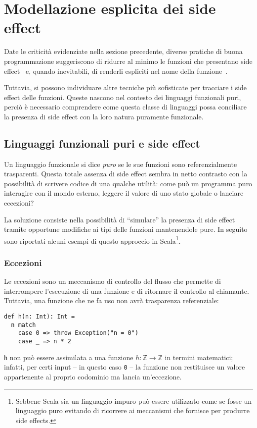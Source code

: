 \section{Modellazione esplicita dei side effect}
\label{modellazione-esplicita-dei-side-effect}

Date le criticità evidenziate nella sezione precedente, diverse pratiche di buona programmazione suggeriscono di ridurre al minimo le funzioni che presentano side effect~\cite[p.~44]{cit:clean-code-a-handbook-of-agile-software-craftsmanship} e, quando inevitabili, di renderli espliciti nel nome della funzione~\cite[p.~313]{cit:clean-code-a-handbook-of-agile-software-craftsmanship}.

Tuttavia, si possono individuare altre tecniche più sofisticate per tracciare i side effect delle funzioni.
Queste nascono nel contesto dei linguaggi funzionali puri, perciò è necessario comprendere come questa classe di linguaggi possa conciliare la presenza di side effect con la loro natura puramente funzionale.

\subsection{Linguaggi funzionali puri e side effect}
\label{linguaggi-funzionali-puri-e-side-effect}
Un linguaggio funzionale si dice \emph{puro} se le sue funzioni sono referenzialmente trasparenti.
Questa totale assenza di side effect sembra in netto contrasto con la possibilità di scrivere codice di una qualche utilità: come può un programma puro interagire con il mondo esterno, leggere il valore di uno stato globale o lanciare eccezioni?

La soluzione consiste nella possibilità di ``simulare'' la presenza di side effect tramite opportune modifiche ai tipi delle funzioni mantenendole pure.
In seguito sono riportati alcuni esempi di questo approccio in Scala\footnote{Sebbene Scala sia un linguaggio impuro può essere utilizzato come se fosse un linguaggio puro evitando di ricorrere ai meccanismi che fornisce per produrre side effects.}.

\subsubsection{Eccezioni}
\label{eccezioni}
Le eccezioni sono un meccanismo di controllo del flusso che permette di interrompere l'esecuzione di una funzione e di ritornare il controllo al chiamante.
Tuttavia, una funzione che ne fa uso non avrà trasparenza referenziale:
\begin{lstlisting}[language=scala3]
def h(n: Int): Int =
  n match
    case 0 => throw Exception("n = 0")
    case _ => n * 2
\end{lstlisting}
\lstinline|h| non può essere assimilata a una funzione $h : \mathbb{Z} \rightarrow \mathbb{Z}$ in termini matematici; infatti, per certi input -- in questo caso \lstinline|0| -- la funzione non restituisce un valore appartenente al proprio codominio ma lancia un'eccezione.

